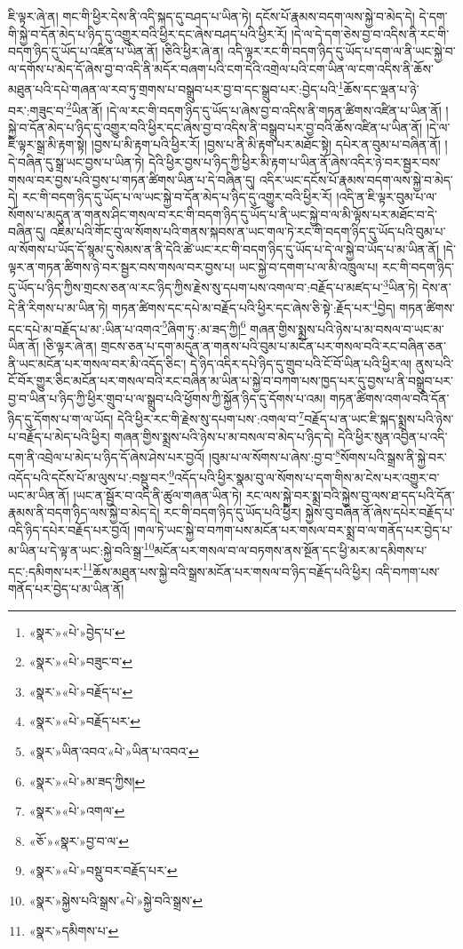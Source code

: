 ཇི་ལྟར་ཞེ་ན། གང་གི་ཕྱིར་དེས་ནི་འདི་སྐད་དུ་བཤད་པ་ཡིན་ཏེ། དངོས་པོ་རྣམས་བདག་ལས་སྐྱེ་བ་མེད་དེ། དེ་དག་གི་སྐྱེ་བ་དོན་མེད་པ་ཉིད་དུ་འགྱུར་བའི་ཕྱིར་དང་ཞེས་བཤད་པའི་ཕྱིར་རོ། །དེ་ལ་དེ་དག་ཅེས་བྱ་བ་འདིས་ནི་རང་གི་བདག་ཉིད་དུ་ཡོད་པ་འཛིན་པ་ཡིན་ནོ། །ཅིའི་ཕྱིར་ཞེ་ན། འདི་ལྟར་རང་གི་བདག་ཉིད་དུ་ཡོད་པ་དག་ལ་ནི་ཡང་སྐྱེ་བ་ལ་དགོས་པ་མེད་དོ་ཞེས་བྱ་བ་འདི་ནི་མདོར་བཞག་པའི་ངག་དེའི་འགྲེལ་པའི་ངག་ཡིན་ལ་ངག་འདིས་ནི་ཆོས་མཐུན་པའི་དཔེ་གཞན་ལ་རབ་ཏུ་གྲགས་པ་བསྒྲུབ་པར་བྱ་བ་དང་སྒྲུབ་པར་:བྱེད་པའི་\footnote{«སྣར་»«པེ་»བྱེད་པ་}ཆོས་དང་ལྡན་པ་ཉེ་བར་:གཟུང་བ་\footnote{«སྣར་»«པེ་»བཟུང་བ་}ཡིན་ནོ། །དེ་ལ་རང་གི་བདག་ཉིད་དུ་ཡོད་པ་ཞེས་བྱ་བ་འདིས་ནི་གཏན་ཚིགས་འཛིན་པ་ཡིན་ནོ། །སྐྱེ་བ་དོན་མེད་པ་ཉིད་དུ་འགྱུར་བའི་ཕྱིར་དང་ཞེས་བྱ་བ་འདིས་ནི་བསྒྲུབ་པར་བྱ་བའི་ཆོས་འཛིན་པ་ཡིན་ནོ། །དེ་ལ་ཇི་ལྟར་སྒྲ་མི་རྟག་སྟེ། །བྱས་པ་མི་རྟག་པའི་ཕྱིར་རོ། །བྱས་པ་ནི་མི་རྟག་པར་མཐོང་སྟེ། དཔེར་ན་བུམ་པ་བཞིན་ནོ། །དེ་བཞིན་དུ་སྒྲ་ཡང་བྱས་པ་ཡིན་ཏེ། དེའི་ཕྱིར་བྱས་པ་ཉིད་ཀྱི་ཕྱིར་མི་རྟག་པ་ཡིན་ནོ་ཞེས་འདིར་ཉེ་བར་སྦྱར་བས་གསལ་བར་བྱས་པའི་བྱས་པ་གཏན་ཚིགས་ཡིན་པ་དེ་བཞིན་དུ། འདིར་ཡང་དངོས་པོ་རྣམས་བདག་ལས་སྐྱེ་བ་མེད་དེ། རང་གི་བདག་ཉིད་དུ་ཡོད་པ་ལ་ཡང་སྐྱེ་བ་དོན་མེད་པ་ཉིད་དུ་འགྱུར་བའི་ཕྱིར་རོ། །འདི་ན་ཇི་ལྟར་བུམ་པ་ལ་སོགས་པ་མདུན་ན་གནས་ཤིང་གསལ་བ་རང་གི་བདག་ཉིད་དུ་ཡོད་པ་ནི་ཡང་སྐྱེ་བ་ལ་མི་ལྟོས་པར་མཐོང་བ་དེ་བཞིན་དུ། འཇིམ་པའི་གོང་བུ་ལ་སོགས་པའི་གནས་སྐབས་ན་ཡང་གལ་ཏེ་རང་གི་བདག་ཉིད་དུ་ཡོད་པའི་བུམ་པ་ལ་སོགས་པ་ཡོད་དོ་སྙམ་དུ་སེམས་ན་ནི་དེའི་ཚེ་ཡང་རང་གི་བདག་ཉིད་དུ་ཡོད་པ་དེ་ལ་སྐྱེ་བ་ཡོད་པ་མ་ཡིན་ནོ། །དེ་ལྟར་ན་གཏན་ཚིགས་ཉེ་བར་སྦྱར་བས་གསལ་བར་བྱས་པ། ཡང་སྐྱེ་བ་དགག་པ་ལ་མི་འཁྲུལ་པ། རང་གི་བདག་ཉིད་དུ་ཡོད་པ་ཉིད་ཀྱིས་གྲངས་ཅན་ལ་རང་ཉིད་ཀྱིས་རྗེས་སུ་དཔག་པས་འགལ་བ་:བརྗོད་པ་མཛད་པ་\footnote{«སྣར་»«པེ་»བརྗོད་པ་}ཡིན་ཏེ། དེས་ན་དེ་ནི་རིགས་པ་མ་ཡིན་ཏེ། གཏན་ཚིགས་དང་དཔེ་མ་བརྗོད་པའི་ཕྱིར་དང་ཞེས་ཅི་སྟེ་:རྗོད་པར་\footnote{«སྣར་»«པེ་»བརྗོད་པར་}བྱེད། གཏན་ཚིགས་དང་དཔེ་མ་བརྗོད་པ་མ་:ཡིན་པ་འགའ་\footnote{«སྣར་»ཡིན་འབའ་«པེ་»ཡིན་པ་འབའ་}ཞིག་ཏུ་:མ་ཟད་ཀྱི།\footnote{«སྣར་»«པེ་»མ་ཟད་ཀྱིས།} གཞན་གྱིས་སྨྲས་པའི་ཉེས་པ་མ་བསལ་བ་ཡང་མ་ཡིན་ནོ། །ཅི་ལྟར་ཞེ་ན། གྲངས་ཅན་པ་དག་མདུན་ན་གནས་པའི་བུམ་པ་མངོན་པར་གསལ་བའི་རང་བཞིན་ཅན་ནི་ཡང་མངོན་པར་གསལ་བར་མི་འདོད་ཅིང་། དེ་ཉིད་འདིར་དཔེ་ཉིད་དུ་གྲུབ་པའི་ངོ་བོ་ཡིན་པའི་ཕྱིར་ལ། ནུས་པའི་ངོ་བོར་གྱུར་ཅིང་མངོན་པར་གསལ་བའི་རང་བཞིན་མ་ཡིན་པ་སྐྱེ་བ་བཀག་པས་ཁྱད་པར་དུ་བྱས་པ་ནི་བསྒྲུབ་པར་བྱ་བ་ཡིན་པ་ཉིད་ཀྱི་ཕྱིར་གྲུབ་པ་ལ་སྒྲུབ་པའི་ཕྱོགས་ཀྱི་སྐྱོན་ཉིད་དུ་དོགས་པ་འམ། གཏན་ཚིགས་འགལ་བའི་དོན་ཉིད་དུ་དོགས་པ་ག་ལ་ཡོད། དེའི་ཕྱིར་རང་གི་རྗེས་སུ་དཔག་པས་:འགལ་བ་\footnote{«སྣར་»«པེ་»འགལ་}བརྗོད་པ་ན་ཡང་ཇི་སྐད་སྨྲས་པའི་ཉེས་པ་བརྗོད་པ་མེད་པའི་ཕྱིར། གཞན་གྱིས་སྨྲས་པའི་ཉེས་པ་མ་བསལ་བ་མེད་པ་ཉིད་དེ། དེའི་ཕྱིར་སུན་འབྱིན་པ་འདི་དག་ནི་འབྲེལ་པ་མེད་པ་ཉིད་དོ་ཞེས་ཤེས་པར་བྱའོ། །བུམ་པ་ལ་སོགས་པ་ཞེས་:བྱ་བ་\footnote{«ཅོ་»«སྣར་»བྱ་བ་ལ་}སོགས་པའི་སྒྲས་ནི་སྐྱེ་བར་འདོད་པའི་དངོས་པོ་མ་ལུས་པ་:བསྡུ་བར་\footnote{«སྣར་»«པེ་»བསྡུ་བར་བརྗོད་པར་}འདོད་པའི་ཕྱིར་སྣམ་བུ་ལ་སོགས་པ་དག་གིས་མ་ངེས་པར་འགྱུར་བ་ཡང་མ་ཡིན་ནོ། །ཡང་ན་སྦྱོར་བ་འདི་ནི་ཚུལ་གཞན་ཡིན་ཏེ། རང་ལས་སྐྱེ་བར་སྨྲ་བའི་སྐྱེས་བུ་ལས་ཐ་དད་པའི་དོན་རྣམས་ནི་བདག་ཉིད་ལས་སྐྱེ་བ་མེད་དེ། རང་གི་བདག་ཉིད་དུ་ཡོད་པའི་ཕྱིར། སྐྱེས་བུ་བཞིན་ནོ་ཞེས་དཔེར་བརྗོད་པ་འདི་ཉིད་དཔེར་བརྗོད་པར་བྱའོ། །གལ་ཏེ་ཡང་སྐྱེ་བ་བཀག་པས་མངོན་པར་གསལ་བར་སྨྲ་བ་ལ་གནོད་པར་བྱེད་པ་མ་ཡིན་པ་དེ་ལྟ་ན་ཡང་:སྐྱེ་བའི་སྒྲ་\footnote{«སྣར་»སྐྱེས་པའི་སྒྲས་«པེ་»སྐྱེ་བའི་སྒྲས་}མངོན་པར་གསལ་བ་ལ་བཏགས་ནས་སྔོན་དང་ཕྱི་མར་མ་དམིགས་པ་དང་:དམིགས་པར་\footnote{«སྣར་»དམིགས་པ་}ཆོས་མཐུན་པས་སྐྱེ་བའི་སྒྲས་མངོན་པར་གསལ་བ་ཉིད་བརྗོད་པའི་ཕྱིར། འདི་བཀག་པས་གནོད་པར་བྱེད་པ་མ་ཡིན་ནོ། 